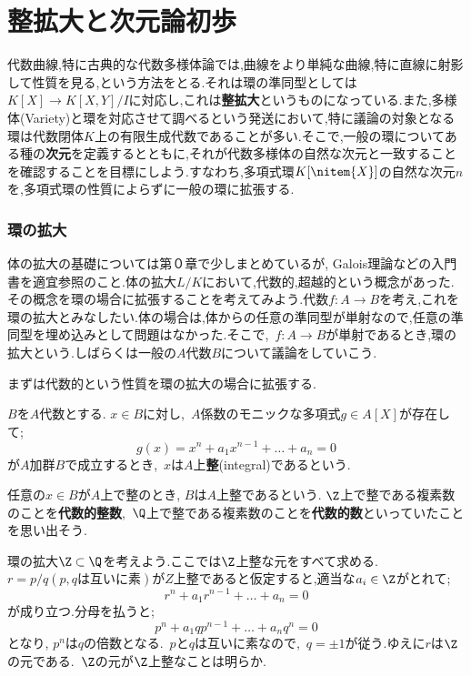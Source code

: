 \newpage
\part[Integral extension and The elemnts of dimension theory]{整拡大と次元論初歩}\label{part:整拡大と次元論初歩}

代数曲線,特に古典的な代数多様体論では,曲線をより単純な曲線,特に直線に射影して性質を見る,という方法をとる.それは環の準同型としては$K[X]\to K[X,Y]/I$に対応し,これは\textbf{整拡大}というものになっている.また,多様体(Variety)と環を対応させて調べるという発送において,特に議論の対象となる環は代数閉体$K$上の有限生成代数であることが多い.そこで,一般の環についてある種の\textbf{次元}を定義するとともに,それが代数多様体の自然な次元と一致することを確認することを目標にしよう.すなわち,多項式環$K[\nitem{X}]$の自然な次元$n$を,多項式環の性質によらずに一般の環に拡張する.

\section{環の拡大}

体の拡大の基礎については第０章で少しまとめているが, Galois理論などの入門書を適宜参照のこと.体の拡大$L/K$において,代数的,超越的という概念があった.その概念を環の場合に拡張することを考えてみよう.代数$f:A\to B$を考え,これを環の拡大とみなしたい.体の場合は,体からの任意の準同型が単射なので,任意の準同型を埋め込みとして問題はなかった.そこで,~$f:A\to B$が単射であるとき,環の拡大という.しばらくは一般の$A$代数$B$について議論をしていこう.

まずは代数的という性質を環の拡大の場合に拡張する.

\begin{defi}[整]
	$B$を$A$代数とする. $x\in B$に対し,~$A$係数のモニックな多項式$g\in A[X]$が存在して;
	\[g(x)=x^n+a_1x^{n-1}+\dots+a_n=0\]
	が$A$加群$B$で成立するとき,~$x$は$A$上\textbf{整}(integral)であるという.
\end{defi}

任意の$x\in B$が$A$上で整のとき, $B$は$A$上整であるという. $\Z$上で整である複素数のことを\textbf{代数的整数},~$\Q$上で整である複素数のことを\textbf{代数的数}といっていたことを思い出そう.

\begin{ex}\label{ex:Q/Zの整閉包}
	環の拡大$\Z\subset\Q$を考えよう.ここでは$\Z$上整な元をすべて求める.~$r=p/q (p,q\text{は互いに素})$が$Z$上整であると仮定すると,適当な$a_i\in\Z$がとれて;
	\[r^n+a_1r^{n-1}+\dots+a_n=0\]
	が成り立つ.分母を払うと;
	\[p^n+a_1qp^{n-1}+\dots+a_nq^n=0\]
	となり, $p^n$は$q$の倍数となる.~$p$と$q$は互いに素なので,~$q=\pm 1$が従う.ゆえに$r$は$\Z$の元である.~$\Z$の元が$\Z$上整なことは明らか.
\end{ex}

